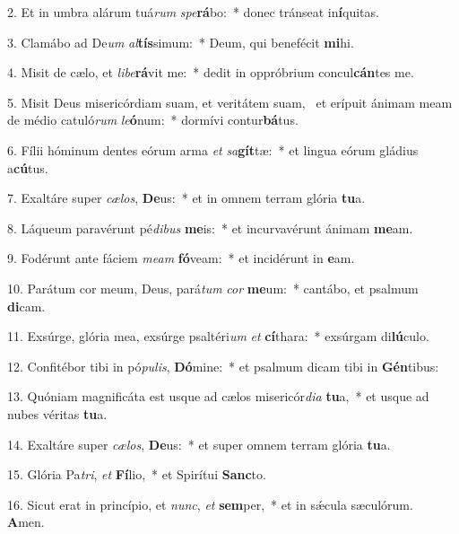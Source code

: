 2. Et in umbra alárum tuá\textit{rum} \textit{spe}\textbf{rá}bo:~*  donec tránseat in\textbf{í}quitas.\

3. Clamábo ad De\textit{um} \textit{al}\textbf{tís}simum:~*  Deum, qui benefécit \textbf{mi}hi.\

4. Misit de cælo, et \textit{li}\textit{be}\textbf{rá}vit me:~*  dedit in oppróbrium concul\textbf{cán}tes me.\

5. Misit Deus misericórdiam suam, et veritátem suam, \dag\  et erípuit ánimam meam de médio catuló\textit{rum} \textit{le}\textbf{ó}num:~*  dormívi contur\textbf{bá}tus.\

6. Fílii hóminum dentes eórum arma \textit{et} \textit{sa}\textbf{gít}tæ:~*  et lingua eórum gládius a\textbf{cú}tus.\

7. Exaltáre super \textit{cæ}\textit{los}, \textbf{De}us:~*  et in omnem terram glória \textbf{tu}a.\

8. Láqueum paravérunt pé\textit{di}\textit{bus} \textbf{me}is:~*  et incurvavérunt ánimam \textbf{me}am.\

9. Fodérunt ante fáciem \textit{me}\textit{am} \textbf{fó}veam:~*  et incidérunt in \textbf{e}am.\

10. Parátum cor meum, Deus, pará\textit{tum} \textit{cor} \textbf{me}um:~*  cantábo, et psalmum \textbf{di}cam.\

11. Exsúrge, glória mea, exsúrge psaltéri\textit{um} \textit{et} \textbf{cí}thara:~*  exsúrgam di\textbf{lú}culo.\

12. Confitébor tibi in pó\textit{pu}\textit{lis}, \textbf{Dó}mine:~*  et psalmum dicam tibi in \textbf{Gén}tibus:\

13. Quóniam magnificáta est usque ad cælos misericór\textit{di}\textit{a} \textbf{tu}a,~*  et usque ad nubes véritas \textbf{tu}a.\

14. Exaltáre super \textit{cæ}\textit{los}, \textbf{De}us:~*  et super omnem terram glória \textbf{tu}a.\

15. Glória Pa\textit{tri}, \textit{et} \textbf{Fí}lio,~*  et Spirítui \textbf{Sanc}to.\

16. Sicut erat in princípio, et \textit{nunc}, \textit{et} \textbf{sem}per,~*  et in sǽcula sæculórum. \textbf{A}men.\

